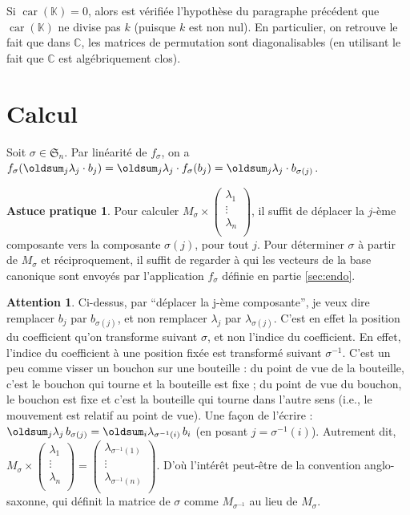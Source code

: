 \documentclass[10pt,a4paper,french,landscape]{article}
\DeclarePairedDelimiter\parenlong{\lparen}{\rparen}
\newcommand{\paren}[1]{\parenlong*{#1}}
\renewcommand{\sum}{\displaystyle\oldsum}
\theoremstyle{definition}
\newtheorem*{as}{Astuce pratique}
\newtheorem*{att}{Attention}
\theoremstyle{remark}
\DeclareMathOperator{\car}{car}
\newcommand{\CC}{\mathbb C}
\newcommand{\KK}{\mathbb K}
\newcommand{\Sy}{\mathfrak{S}}
\newcommand{\1}{\mathbbm{1}}
\newcommand{\Sn}[1][n]{\Sy_{#1}}
\begin{document}
\begin{multicols*}{2}
Si $\car(\KK)=0$, alors est vérifiée l'hypothèse du paragraphe précédent que $\car(\KK)$ ne divise pas $k$ (puisque $k$ est non nul). En particulier, on retrouve le fait que dans $\CC$, les matrices de permutation sont diagonalisables (en utilisant le fait que $\CC$ est algébriquement clos).

\section{Calcul}
\label{sec:calcul}

\noindent
Soit $\sigma\in\Sn$. Par linéarité de $f_\sigma$, on a \quad
$f_\sigma\paren{\sum_j \lambda_j\cdot b_j} = \sum_j \lambda_j\cdot f_\sigma\paren{b_j} = \sum_j \lambda_j\cdot b_{\sigma(j)}$.

\begin{as}
Pour calculer $M_\sigma\times
\begin{pmatrix}
	\lambda_1 \\
	\vdots \\
	\lambda_n \\
\end{pmatrix}$, il suffit de déplacer la $j$-ème composante vers la composante $\sigma(j)$, pour tout $j$. Pour déterminer $\sigma$ à partir de $M_\sigma$ et réciproquement, il suffit de regarder à qui les vecteurs de la base canonique sont envoyés par l'application $f_\sigma$ définie en partie \ref{sec:endo}.
\end{as}

\begin{att}
Ci-dessus, par ``déplacer la j-ème composante'', je veux dire remplacer $b_j$ par $b_{\sigma(j)}$, et non remplacer $\lambda_j$ par $\lambda_{\sigma(j)}$. C'est en effet la position du coefficient qu'on transforme suivant $\sigma$, et non l'indice du coefficient. En effet, l'indice du coefficient à une position fixée est transformé suivant $\sigma^{-1}$. C'est un peu comme visser un bouchon sur une bouteille : du point de vue de la bouteille, c'est le bouchon qui tourne et la bouteille est fixe ; du point de vue du bouchon, le bouchon est fixe et c'est la bouteille qui tourne dans l'autre sens (i.e., le mouvement est relatif au point de vue). Une façon de l'écrire :
$\sum_j \lambda_j\, b_{\sigma(j)} = \sum_i \lambda_{\sigma^{-1}(i)}\, b_i$ (en posant $j=\sigma^{-1}(i)$).
Autrement dit, 
$M_\sigma\times
\begin{pmatrix}
	\lambda_1 \\
	\vdots \\
	\lambda_n \\
\end{pmatrix}
=
\begin{pmatrix}
	\lambda_{\sigma^{-1}(1)} \\
	\vdots \\
	\lambda_{\sigma^{-1}(n)} \\
\end{pmatrix}
$. D'où l'intérêt peut-être de la convention
anglo-saxonne, qui
%
définit la matrice de $\sigma$ comme $M_{\sigma^{-1}}$ au lieu de $M_\sigma$.
\end{att}


\end{multicols*}
\end{document}

